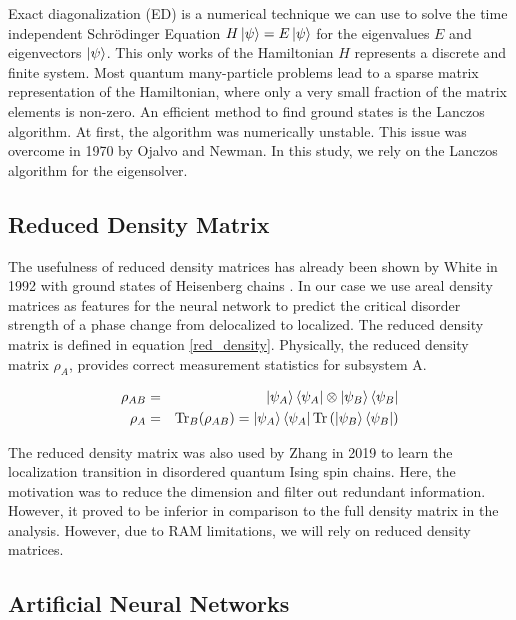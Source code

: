 \documentclass[reprint,amsmath,amssymb,aps,prb]{revtex4-2}
\begin{document}
Exact diagonalization (ED) is a numerical technique we can use to solve the time independent Schrödinger Equation $H\ket{\psi}=E\ket{\psi}$ for the eigenvalues $E$ and eigenvectors $\ket{\psi}$. This only works of the Hamiltonian $H$ represents a discrete and finite system. Most quantum many-particle problems lead to a sparse matrix representation of the Hamiltonian, where only a very small fraction of the matrix
elements is non-zero.\cite{Weisse2008} An efficient method to find ground states is the Lanczos algorithm.\cite{Lanczos1950} At first, the algorithm was numerically unstable. This issue was overcome in 1970 by Ojalvo and Newman.\cite{Ojalvo1970} In this study, we rely on the Lanczos algorithm for the eigensolver.

\subsection{Reduced Density Matrix}

The usefulness of reduced density matrices has already been shown by White in 1992 with ground states of Heisenberg chains \cite{White1992}. In our case we use areal density matrices as features for the neural network to predict the critical disorder strength of a phase change from delocalized to localized. The reduced density matrix is defined in equation \ref{red_density}. Physically, the reduced density matrix $\rho_A$, provides correct measurement statistics for subsystem A.

\begin{eqnarray}
\rho_{AB}&=&\ket{\psi_A}\bra{\psi_A}\otimes\ket{\psi_B}\bra{\psi_B}\\
\rho_A&=&\text{Tr}_B(\rho_{AB})=\ket{\psi_A}\bra{\psi_A}\text{Tr}\left(\ket{\psi_B}\bra{\psi_B}\right)\label{red_density}
\end{eqnarray}%

The reduced density matrix was also used by Zhang in 2019 to learn the localization transition in disordered quantum Ising spin chains. Here, the motivation was to reduce the dimension and filter out redundant information. However, it proved to be inferior in comparison to the full density matrix in the analysis. \cite{Zhang2019} However, due to RAM limitations, we will rely on reduced density matrices.


\subsection{Artificial Neural Networks}
\end{document}
